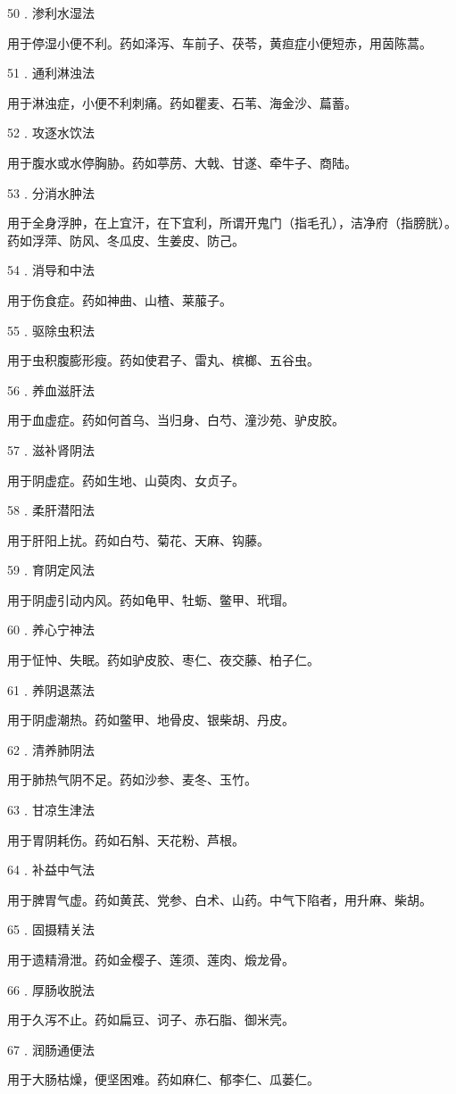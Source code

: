\documentclass[a4paper,12pt,UTF8,twoside]{ctexbook}
\begin{document}
50﹒渗利水湿法

用于停湿小便不利。药如泽泻、车前子、茯苓，黄疸症小便短赤，用茵陈蒿。

51﹒通利淋浊法

用于淋浊症，小便不利刺痛。药如瞿麦、石苇、海金沙、萹蓄。

52﹒攻逐水饮法

用于腹水或水停胸胁。药如葶苈、大戟、甘遂、牵牛子、商陆。

53﹒分消水肿法

用于全身浮肿，在上宜汗，在下宜利，所谓开鬼门（指毛孔），洁净府（指膀胱）。药如浮萍、防风、冬瓜皮、生姜皮、防己。

54﹒消导和中法

用于伤食症。药如神曲、山楂、莱菔子。

55﹒驱除虫积法

用于虫积腹膨形瘦。药如使君子、雷丸、槟榔、五谷虫。

56﹒养血滋肝法

用于血虚症。药如何首乌、当归身、白芍、潼沙苑、驴皮胶。

57﹒滋补肾阴法

用于阴虚症。药如生地、山萸肉、女贞子。

58﹒柔肝潜阳法

用于肝阳上扰。药如白芍、菊花、天麻、钩藤。

59﹒育阴定风法

用于阴虚引动内风。药如龟甲、牡蛎、鳖甲、玳瑁。

60﹒养心宁神法

用于怔忡、失眠。药如驴皮胶、枣仁、夜交藤、柏子仁。

61﹒养阴退蒸法

用于阴虚潮热。药如鳖甲、地骨皮、银柴胡、丹皮。

62﹒清养肺阴法

用于肺热气阴不足。药如沙参、麦冬、玉竹。

63﹒甘凉生津法

用于胃阴耗伤。药如石斛、天花粉、芦根。

64﹒补益中气法

用于脾胃气虚。药如黄芪、党参、白术、山药。中气下陷者，用升麻、柴胡。

65﹒固摄精关法

用于遗精滑泄。药如金樱子、莲须、莲肉、煅龙骨。

66﹒厚肠收脱法

用于久泻不止。药如扁豆、诃子、赤石脂、御米壳。

67﹒润肠通便法

用于大肠枯燥，便坚困难。药如麻仁、郁李仁、瓜蒌仁。
\end{document}
